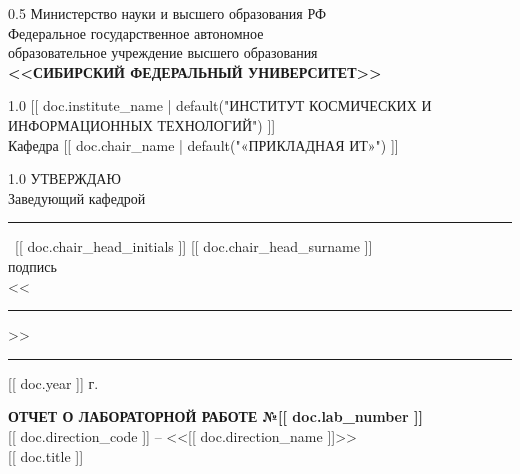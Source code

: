 \begin{titlepage}
    \begin{center}
        \begin{spacing}{0.5}
        Министерство науки и высшего образования РФ\\
        {\small Федеральное государственное автономное}\\
        {\small образовательное учреждение высшего образования}\\
        \textbf{\small<<СИБИРСКИЙ ФЕДЕРАЛЬНЫЙ УНИВЕРСИТЕТ>>}\\
        \end{spacing}
        \vfill
        \begin{spacing}{1.0}
        [[ doc.institute_name | default("ИНСТИТУТ КОСМИЧЕСКИХ И ИНФОРМАЦИОННЫХ ТЕХНОЛОГИЙ") ]]\\
        Кафедра [[ doc.chair_name | default("«ПРИКЛАДНАЯ ИТ»") ]]\\
        \end{spacing}
    \end{center}        
    
    \begin{minipage}[h]{0.45\linewidth}\hfil\end{minipage}
    \hspace{5mm}
    \begin{minipage}[h]{0.45\linewidth}
        \begin{spacing}{1.0}
            УТВЕРЖДАЮ\\
            Заведующий кафедрой\\[10mm]
            \rule{2cm}{.1pt}~[[ doc.chair_head_initials ]] [[ doc.chair_head_surname ]]\\
            {\small подпись}\\[10mm]
            <<\rule{1cm}{.1pt}>>\rule{2.5cm}{.1pt} [[ doc.year ]] г.
        \end{spacing}
    \end{minipage}
    
    \vspace{7mm}
    \vfill
    \begin{center}
        {\Large \textbf{ОТЧЕТ О ЛАБОРАТОРНОЙ РАБОТЕ №[[ doc.lab_number ]]}}\\[7mm]
        [[ doc.direction_code ]] -- <<[[ doc.direction_name ]]>>\\[3mm]
        [[ doc.title ]]
    \end{center}
    \vfill
    

\end{titlepage}
